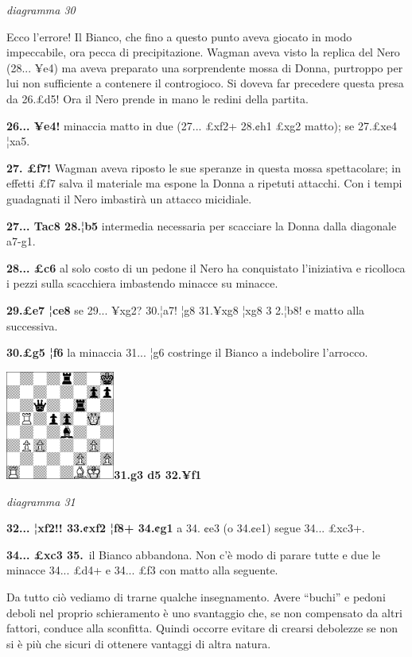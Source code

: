 \documentclass[
]{article}
\begin{document}
\emph{diagramma 30}

Ecco l'errore! Il Bianco, che fino a questo punto aveva giocato in modo
impeccabile, ora pecca di precipitazione. Wagman aveva visto la replica
del Nero (28... ¥e4) ma aveva preparato una sorprendente mossa di Donna,
purtroppo per lui non sufficiente a contenere il controgioco. Si doveva
far precedere questa presa da 26.£d5! Ora il Nero prende in mano le
redini della partita.

\textbf{26... ¥e4!} minaccia matto in due (27... £xf2+ 28.¢h1 £xg2
matto); se 27.£xe4 ¦xa5.

\textbf{27. £f7!} Wagman aveva riposto le sue speranze in questa mossa
spettacolare; in effetti £f7 salva il materiale ma espone la Donna a
ripetuti attacchi. Con i tempi guadagnati il Nero imbastirà un attacco
micidiale.

\textbf{27... Tac8 28.¦b5} intermedia necessaria per scacciare la Donna
dalla diagonale a7-g1.

\textbf{28... £c6} al solo costo di un pedone il Nero ha conquistato
l'iniziativa e ricolloca i pezzi sulla scacchiera imbastendo minacce su
minacce.

\textbf{29.£e7 ¦ce8} se 29... ¥xg2? 30.¦a7! ¦g8 31.¥xg8 ¦xg8 3 2.¦b8! e
matto alla successiva.

\textbf{30.£g5 ¦f6} la minaccia 31... ¦g6 costringe il Bianco a
indebolire l'arrocco.

\includegraphics[width=1.40972in,height=1.40972in]{vertopal_109f12be458a423d8f3cc838880eaea2/media/image31.png}\textbf{31.g3
d5 32.¥f1}

\emph{diagramma 31}

\textbf{32... ¦xf2!! 33.¢xf2 ¦f8+ 34.¢g1} a 34. ¢e3 (o 34.¢e1) segue
34... £xc3+.

\textbf{34... £xc3 35.}~il Bianco abbandona. Non c'è modo di parare
tutte e due le minacce 34... £d4+ e 34... £f3 con matto alla seguente.

Da tutto ciò vediamo di trarne qualche insegnamento. Avere ``buchi'' e
pedoni deboli nel proprio schieramento è uno svantaggio che, se non
compensato da altri fattori, conduce alla sconfitta. Quindi occorre
evitare di crearsi debolezze se non si è più che sicuri di ottenere
vantaggi di altra natura.
\end{document}
